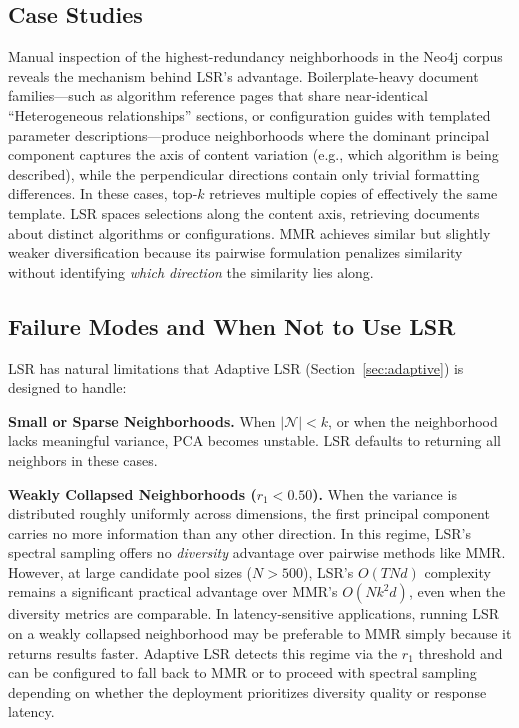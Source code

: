 \documentclass{article}
\begin{document}
\subsection{Case Studies}

Manual inspection of the highest-redundancy neighborhoods in the Neo4j corpus reveals the mechanism behind LSR's advantage. Boilerplate-heavy document families---such as algorithm reference pages that share near-identical ``Heterogeneous relationships'' sections, or configuration guides with templated parameter descriptions---produce neighborhoods where the dominant principal component captures the axis of content variation (e.g., which algorithm is being described), while the perpendicular directions contain only trivial formatting differences. In these cases, top-$k$ retrieves multiple copies of effectively the same template. LSR spaces selections along the content axis, retrieving documents about distinct algorithms or configurations. MMR achieves similar but slightly weaker diversification because its pairwise formulation penalizes similarity without identifying \emph{which direction} the similarity lies along.


\subsection{Failure Modes and When Not to Use LSR}

LSR has natural limitations that Adaptive LSR (Section~\ref{sec:adaptive}) is designed to handle:

\textbf{Small or Sparse Neighborhoods.}
When $|\mathcal{N}| < k$, or when the neighborhood lacks meaningful variance, PCA becomes unstable. LSR defaults to returning all neighbors in these cases.

\textbf{Weakly Collapsed Neighborhoods ($r_1 < 0.50$).}
When the variance is distributed roughly uniformly across dimensions, the first principal component carries no more information than any other direction. In this regime, LSR's spectral sampling offers no \emph{diversity} advantage over pairwise methods like MMR. However, at large candidate pool sizes ($N > 500$), LSR's $O(TNd)$ complexity remains a significant practical advantage over MMR's $O(Nk^2 d)$, even when the diversity metrics are comparable. In latency-sensitive applications, running LSR on a weakly collapsed neighborhood may be preferable to MMR simply because it returns results faster. Adaptive LSR detects this regime via the $r_1$ threshold and can be configured to fall back to MMR or to proceed with spectral sampling depending on whether the deployment prioritizes diversity quality or response latency.
\end{document}
